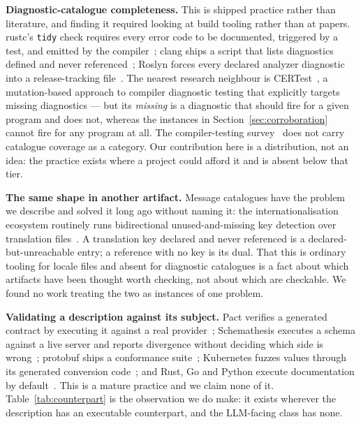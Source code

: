 \documentclass[10pt,journal,compsoc]{IEEEtran}
\begin{document}
\textbf{Diagnostic-catalogue completeness.} This is shipped practice rather than literature, and
finding it required looking at build tooling rather than at papers. rustc's \texttt{tidy} check
requires every error code to be documented, triggered by a test, and emitted by the
compiler~\cite{rustc_tidy_errorcodes}; clang ships a script that lists diagnostics defined and
never referenced~\cite{clang_unused_diagnostics}; Roslyn forces every declared analyzer
diagnostic into a release-tracking file~\cite{roslyn_release_tracking}. The nearest research
neighbour is CERTest~\cite{tang2025certest}, a mutation-based approach to compiler diagnostic
testing that explicitly targets missing diagnostics --- but its \emph{missing} is a diagnostic
that should fire for a given program and does not, whereas the instances in
Section~\ref{sec:corroboration} cannot fire for any program at all. The compiler-testing
survey~\cite{chen2020compilertesting} does not carry catalogue coverage as a category. Our
contribution here is a distribution, not an idea: the practice exists where a project could
afford it and is absent below that tier.

\textbf{The same shape in another artifact.} Message catalogues have the problem we describe
and solved it long ago without naming it: the internationalisation ecosystem routinely runs
bidirectional unused-and-missing key detection over translation
files~\cite{i18n_tasks,i18n_unused}. A translation key declared and never referenced is a
declared-but-unreachable entry; a reference with no key is its dual. That this is ordinary
tooling for locale files and absent for diagnostic catalogues is a fact about which artifacts
have been thought worth checking, not about which are checkable. We found no work treating the
two as instances of one problem.

\textbf{Validating a description against its subject.} Pact verifies a generated contract by
executing it against a real provider~\cite{pact_contract_testing}; Schemathesis executes a
schema against a live server and reports divergence without deciding which side is
wrong~\cite{schemathesis}; protobuf ships a conformance suite~\cite{protobuf_conformance};
Kubernetes fuzzes values through its generated conversion code~\cite{k8s_roundtrip}; and Rust,
Go and Python execute documentation by
default~\cite{rust_doctests,go_testable_examples,python_doctest}. This is a mature practice and
we claim none of it. Table~\ref{tab:counterpart} is the observation we do make: it exists
wherever the description has an executable counterpart, and the LLM-facing class has none.
\end{document}
